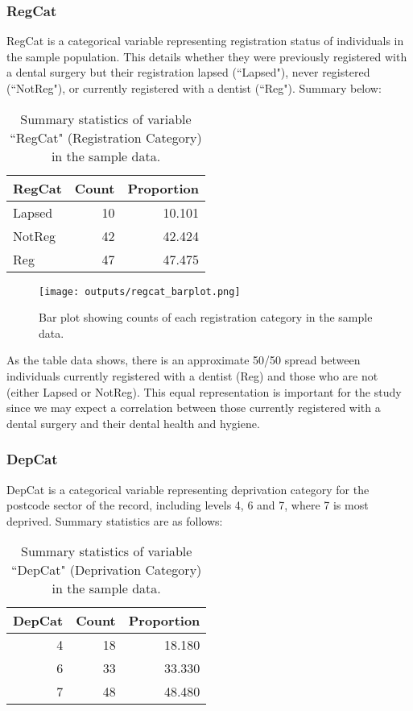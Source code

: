 \documentclass[11pt]{article}
\begin{document}
\subsubsection*{RegCat}

RegCat is a categorical variable representing registration status of individuals in the sample population. This details whether they were previously registered with a dental surgery but their registration lapsed (``Lapsed"), never registered (``NotReg"), or currently registered with a dentist (``Reg"). Summary below:

\begin{table}[h]
\centering
\begin{tabular}{|l|r|r|}
\hline
RegCat & Count & Proportion \\
\hline
Lapsed & 10 & 10.101 \\
NotReg & 42 & 42.424 \\
Reg & 47 & 47.475 \\
\hline
\end{tabular}
\caption{Summary statistics of variable ``RegCat" (Registration Category) in the sample data.}
\label{tab:regcat-data}
\end{table}
\begin{figure}
  \centering
  \texttt{[image: outputs/regcat\_barplot.png]}
  \caption{Bar plot showing counts of each registration category in the sample data.}
  \label{fig:regcat-barplot}
\end{figure}
\FloatBarrier  %

As the table data shows, there is an approximate 50/50 spread between individuals currently registered with a dentist (Reg) and those who are not (either Lapsed or NotReg). This equal representation is important for the study since we may expect a correlation between those currently registered with a dental surgery and their dental health and hygiene.  

\subsubsection*{DepCat}

DepCat is a categorical variable representing deprivation category for the postcode sector of the record, including levels 4, 6 and 7, where 7 is most deprived. Summary statistics are as follows:

\begin{table}[h]
\centering
\begin{tabular}{|r|r|r|}
\hline
DepCat & Count & Proportion \\
\hline
4 & 18 & 18.180 \\
6 & 33 & 33.330 \\
7 & 48 & 48.480 \\
\hline
\end{tabular}
\caption{Summary statistics of variable ``DepCat" (Deprivation Category) in the sample data.}
\label{tab:depcat-data}
\end{table}
\end{document}
